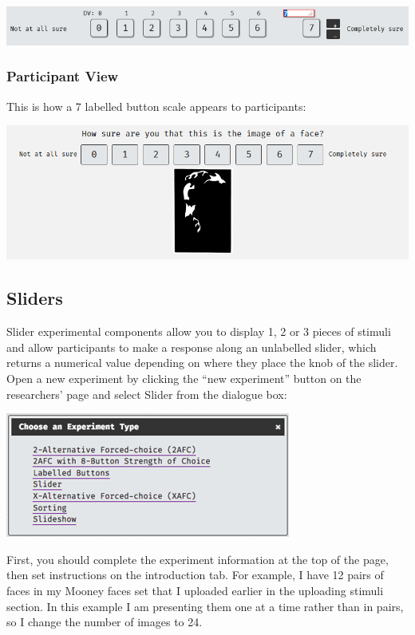\documentclass[]{book}
\begin{document}
\includegraphics{images/screenshots/exp_12.png}

\subsubsection*{Participant View}\label{participant-view-2}

This is how a 7 labelled button scale appears to participants:

\includegraphics{images/screenshots/view_lb.png}

\subsection{Sliders}\label{sliders}

Slider experimental components allow you to display 1, 2 or 3 pieces of
stimuli and allow participants to make a response along an unlabelled
slider, which returns a numerical value depending on where they place
the knob of the slider. Open a new experiment by clicking the ``new
experiment'' button on the researchers' page and select Slider from the
dialogue box:

\includegraphics{images/screenshots/exp_2.png}

First, you should complete the experiment information at the top of the
page, then set instructions on the introduction tab. For example, I have
12 pairs of faces in my Mooney faces set that I uploaded earlier in the
uploading stimuli section. In this example I am presenting them one at a
time rather than in pairs, so I change the number of images to 24.
\end{document}
